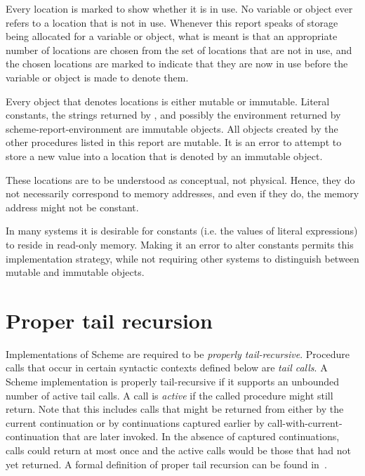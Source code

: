 Every location is marked to show whether it is in use.
No variable or object ever refers to a location that is not in use.
Whenever this report speaks of storage being allocated for a variable
or object, what is meant is that an appropriate number of locations are
chosen from the set of locations that are not in use, and the chosen
locations are marked to indicate that they are now in use before the variable
or object is made to denote them.

Every object that denotes locations is 
either mutable or
immutable.  Literal constants, the strings
returned by ,
and possibly the environment returned by {\cf scheme-report-environment}
are immutable objects.  All objects
created by the other procedures listed in this report are mutable.
It is an
error to attempt to store a new value into a location that is denoted by an
immutable object.


These locations are to be understood as conceptual, not physical.
Hence, they do not necessarily correspond to memory addresses,
and even if they do, the memory address might not be constant.

\begin{rationale}
In many systems it is desirable for constants (i.e. the values of
literal expressions) to reside in read-only memory.
Making it an error to alter constants permits this implementation strategy,
while not requiring other systems to distinguish between
mutable and immutable objects.
\end{rationale}

\section{Proper tail recursion}
\label{proper tail recursion}

Implementations of Scheme are required to be
{\em properly tail-recursive}.
Procedure calls that occur in certain syntactic
contexts defined below are {\em tail calls}.  A Scheme implementation is
properly tail-recursive if it supports an unbounded number of active
tail calls.  A call is {\em active} if the called procedure might still
return.  Note that this includes calls that might be returned from either
by the current continuation or by continuations captured earlier by
{\cf call-with-current-continuation} that are later invoked.
In the absence of captured continuations, calls could
return at most once and the active calls would be those that had not
yet returned.
A formal definition of proper tail recursion can be found
in~\cite{propertailrecursion}.

